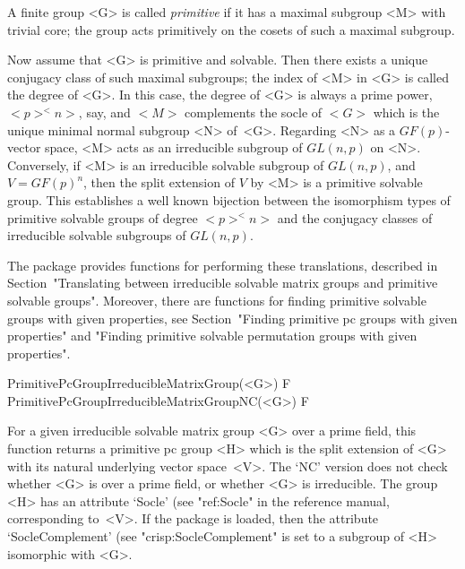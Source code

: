 


A finite group <G> is called {\it primitive} if it has a maximal subgroup <M> with 
trivial core; the group acts primitively on the cosets of such
a maximal subgroup.  

Now assume that <G> is primitive and solvable. Then there exists a unique conjugacy class of 
such maximal subgroups; the index of <M> in <G> is called the degree of <G>.
In this case, the degree of <G> is always a prime power, $<p>^<n>$, say, and $<M>$ 
complements the socle of $<G>$ which is the unique minimal normal subgroup <N> of~<G>. 
Regarding <N> as a $GF(p)$-vector space, <M> acts as an irreducible subgroup of $GL(n,p)$ on <N>.
Conversely, if <M> is an irreducible solvable subgroup of $GL(n,p)$, and $V = GF(p)^n$, then the
split extension of $V$ by <M> is a primitive solvable group. 
This establishes a well known
bijection between the isomorphism types of primitive solvable groups of degree
$<p>^<n>$ and the conjugacy classes of irreducible solvable subgroups of $GL(n, p)$.

The {\IRREDSOL} package provides functions for performing these translations,
described in Section~"Translating between irreducible solvable matrix groups 
and primitive solvable groups". Moreover, there are functions for finding
primitive solvable groups with given properties, see Section~"Finding primitive pc groups
with given properties" and "Finding primitive solvable permutation groups
with given properties".




\>PrimitivePcGroupIrreducibleMatrixGroup(<G>) F
\>PrimitivePcGroupIrreducibleMatrixGroupNC(<G>) F

For a given irreducible solvable matrix group <G> over a prime field, this function
returns a primitive pc group <H> which is the split extension of <G> with its natural
underlying vector space~<V>. The `NC' version does not check whether <G> is over a prime field, 
or whether <G> is irreducible. The group <H> has an attribute `Socle' (see "ref:Socle" 
in the {\GAP} reference manual, corresponding to~<V>. If the package {\CRISP} is loaded, 
then the attribute `SocleComplement' (see "crisp:SocleComplement" is set to a subgroup of 
<H> isomorphic with <G>.

